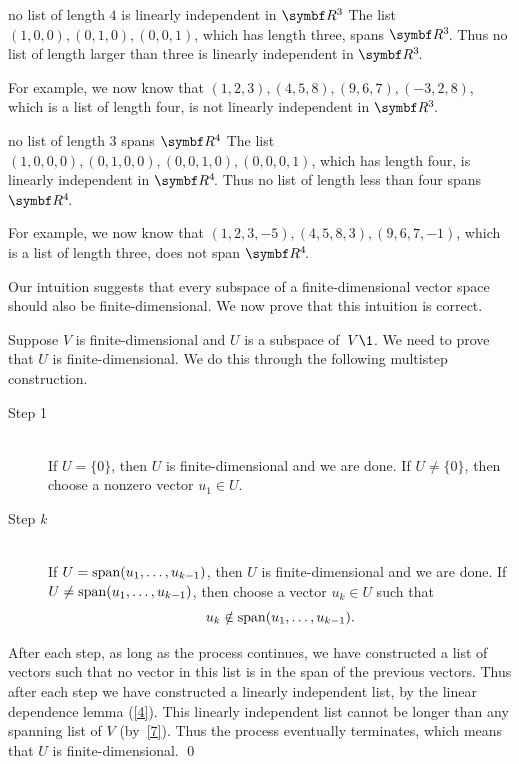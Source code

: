 \begin{example}{no list of length\/ $4$ is linearly independent in\/ $\R{3}$}
The list $(1, 0, 0), (0, 1, 0), (0, 0, 1)$, which has length three, spans $\RR{3}$. Thus no list of length larger than three is linearly independent in $\RR{3}$.

For example, we now know that $(1,2, 3), (4,5,8), (9, 6, 7), (-3, 2, 8)$, which is a list of length four, is not linearly independent in $\RR3$.
\end{example}

\begin{example}{no list of length\/ $3$ spans\/ $\R{4}$}
The list $(1, 0, 0, 0), (0, 1, 0, 0), (0, 0, 1, 0), (0, 0, 0, 1)$, which has length four, is linearly independent in $\RR{4}$. Thus no list of length less than four spans $\RR{4}$.

For example, we now know that $(1,2, 3, -5), (4,5,8, 3), (9, 6, 7, -1)$, which is a list of length three, does not span $\RR{4}$.
\end{example}

Our intuition suggests that every subspace of a finite-dimensional vector space should also be finite-dimensional.  We now prove that this intuition is correct.


\proof
Suppose $V$ is finite-dimensional and $U$ is a subspace of~$V\1$.  We need to prove that $U$ is finite-dimensional. We do this through the following multistep construction.

\begin{description}
\item[Step 1] \ \\ If $U = \{0\}$, then $U$ is finite-dimensional and we are done.
If $U \ne \{0\}$, then choose a nonzero vector $u_1 \in U$.

\item[Step \textit{k}] \ \\ If $U = \operatorname{span}(u_1, \dots, u_{k-1})$, then $U$ is finite-dimensional and we are done. If $U \ne \operatorname{span}(u_1, \dots, u_{k-1})$, then choose
a  vector $u_k \in U$ such that
\[
u_k \notin \operatorname{span}(u_1, \dots, u_{k-1}).
\]
\end{description}
\vspace{-4bp}

After each step, as long as the process continues, we have constructed a list
of vectors such that no vector in this list is in the span of the previous
vectors.  Thus after each step we have constructed a linearly independent
list, by the linear dependence lemma (\ref{4}).  This linearly independent
list cannot be longer than any
spanning list of $V$ (by~\ref{7}). Thus the process eventually
terminates, which means that $U$ is finite-dimensional.
\qed

